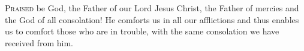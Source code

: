 \lettrine[lines=3,loversize=0.15]{P}{raised} be God, the Father of our Lord Jesus Christ, the Father of mercies and the God of all consolation! He comforts us in all our afflictions and thus enables us to comfort those who are in trouble, with the same consolation we have received from him.
